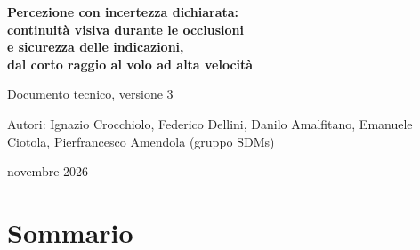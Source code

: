 
\newcommand{\autori}{Ignazio Crocchiolo, Federico Dellini, Danilo Amalfitano, Emanuele Ciotola, Pierfrancesco Amendola (gruppo SDMs)}

\begin{titlepage}
\centering
\vspace*{4cm}
{\LARGE\bfseries\color{accent} Percezione con incertezza dichiarata:\\[4pt] continuità visiva durante le occlusioni\\[4pt] e sicurezza delle indicazioni,\\[4pt] dal corto raggio al volo ad alta velocità\par}
\vspace{1.2cm}
{\Large Documento tecnico, versione 3\par}
\vspace{2.5cm}
{\large Autori: \autori\par}
\vspace{0.8cm}
{\large novembre 2026\par}
\vfill
\end{titlepage}

\section*{Sommario}


\tableofcontents
\clearpage

\clearpage












\clearpage
\appendix


\clearpage
\begingroup\sloppy\def\UrlBreaks{\do\/\do\-\do\_\do\.}


\endgroup

